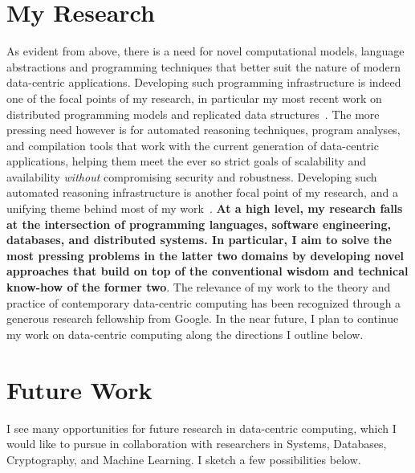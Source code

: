 \section*{My Research}

As evident from above, there is a need for novel computational models,
language abstractions and programming techniques that better suit the
nature of modern data-centric applications. Developing such
programming infrastructure is indeed one of the focal points of my
research, in particular my most recent work on distributed programming
models and replicated data structures~\cite{oopsla19,snapl19,thesis}.
The more pressing need however is for automated reasoning techniques,
program analyses, and compilation tools that work with the current
generation of data-centric applications, helping them meet the ever so
strict goals of scalability and availability \emph{without}
compromising security and robustness. Developing such automated
reasoning infrastructure is another focal point of my research, and a
unifying theme behind most of my
work~\cite{popl18,oopsla18,ecoop18,icfp14,pldi15}. \textbf{At a high level, my
research falls at the intersection of programming languages, software
engineering, databases, and distributed systems. In particular, I aim
to solve the most pressing problems in the latter two domains by
developing novel approaches that build on top of the conventional
wisdom and technical know-how of the former two}. The relevance
of my work to the theory and practice of contemporary data-centric
computing has been recognized through a generous research fellowship
from Google. In the near future, I plan to continue my work on
data-centric computing along the directions I outline below.

\section*{Future Work}

I see many opportunities for future research in data-centric
computing, which I would like to pursue in collaboration with
researchers in Systems, Databases, Cryptography, and Machine Learning.
I sketch a few possibilities below.

